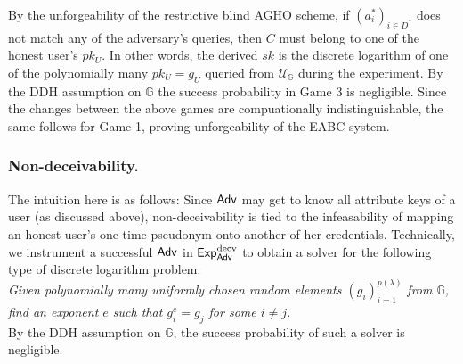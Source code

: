 By the unforgeability of the  restrictive blind AGHO scheme, if $(a_i^*)_{i\in D^*}$ does not match any of the adversary's queries, then $C$ must belong to one of the honest user's $pk_U$.
In other words, the derived $sk$ is the discrete logarithm of one of the polynomially many $pk_U=g_U$ queried from $\mathcal U_{\mathbb G}$ during the experiment.
By the DDH assumption on $\mathbb G$ the success probability in Game 3 is negligible.
Since the changes between the above games are compuationally indistinguishable, the same follows for Game 1, proving unforgeability of the EABC system.




\subsubsection{Non-deceivability.}
The intuition here is as follows:
Since $\mathsf{Adv}$ may get to know all attribute keys of a user (as discussed above), non-deceivability is tied to the infeasability of mapping an honest user's one-time pseudonym onto another of her credentials.
Technically, we instrument a successful $\mathsf{Adv}$ in $\operatorname{\mathsf{Exp}_{\mathsf{Adv}}^{decv}}$ to obtain a solver for the following type of discrete logarithm problem:
\\
\emph{
Given polynomially many uniformly chosen random elements $(g_i)_{i=1}^{p(\lambda)}$ from $\mathbb G$, find an exponent $e$ such that $g_{i}^{e}= g_j$ for some $i\neq j$.
}
\\
By the DDH assumption on $\mathbb G$, the success probability of such a solver is negligible.

